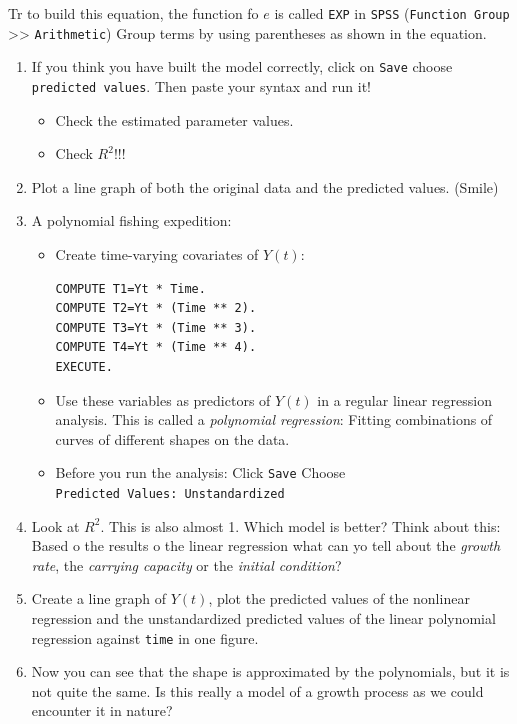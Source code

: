 \documentclass[]{book}
\providecommand{\tightlist}{%
  \setlength{\itemsep}{0pt}\setlength{\parskip}{0pt}}
\begin{document}
Tr to build this equation, the function fo \(e\) is called \texttt{EXP}
in \texttt{SPSS} (\texttt{Function\ Group} \textgreater{}\textgreater{}
\texttt{Arithmetic}) Group terms by using parentheses as shown in the
equation.

\begin{enumerate}
\def\labelenumi{\arabic{enumi}.}
\setcounter{enumi}{4}
\item
  If you think you have built the model correctly, click on
  \texttt{Save} choose \texttt{predicted\ values}. Then paste your
  syntax and run it!

  \begin{itemize}
  \tightlist
  \item
    Check the estimated parameter values.
  \item
    Check \(R^2\)!!!
  \end{itemize}
\item
  Plot a line graph of both the original data and the predicted values.
  (Smile)
\item
  A polynomial fishing expedition:

  \begin{itemize}
  \item
    Create time-varying covariates of \(Y(t)\):

\begin{verbatim}
COMPUTE T1=Yt * Time.
COMPUTE T2=Yt * (Time ** 2). 
COMPUTE T3=Yt * (Time ** 3). 
COMPUTE T4=Yt * (Time ** 4). 
EXECUTE.
\end{verbatim}
  \item
    Use these variables as predictors of \(Y(t)\) in a regular linear
    regression analysis. This is called a \emph{polynomial regression}:
    Fitting combinations of curves of different shapes on the data.
  \item
    Before you run the analysis: Click \texttt{Save} Choose
    \texttt{Predicted\ Values:\ Unstandardized}
  \end{itemize}
\item
  Look at \(R^2\). This is also almost 1. Which model is better? Think
  about this: Based o the results o the linear regression what can yo
  tell about the \emph{growth rate}, the \emph{carrying capacity} or the
  \emph{initial condition}?
\item
  Create a line graph of \(Y(t)\), plot the predicted values of the
  nonlinear regression and the unstandardized predicted values of the
  linear polynomial regression against \texttt{time} in one figure.
\item
  Now you can see that the shape is approximated by the polynomials, but
  it is not quite the same. Is this really a model of a growth process
  as we could encounter it in nature?
\end{enumerate}
\end{document}
